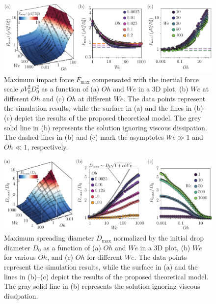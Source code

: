\documentclass[preprint,amssymb,superscriptaddress,aps,prl,floatfix]{revtex4-1}
\begin{document}
\begin{figure}
\centering
\includegraphics[width=\linewidth]{Figure2_v4-eps-converted-to.pdf}
\caption{Maximum impact force $F_{\text{max}}$ compensated with the inertial force scale $\rho V_0^2D_0^2$ as a function of (a) $Oh$ and $We$ in a 3D plot, (b) $We$ at different $Oh$ and (c) $Oh$ at different $We$.  The data points represent the simulation results, while the surface in (a) and the lines in (b)--(c) depict the results of the proposed theoretical model. The grey solid line in (b) represents the solution ignoring viscous dissipation. The dashed lines in (b) and (c) mark the asymptotes $We \gg 1$ and $Oh \ll 1$, respectively.}
\label{fig:2}
\end{figure}


\begin{figure}
	\centering
	\includegraphics[width=\linewidth]{Figure3_v6-eps-converted-to.pdf}
	\caption{
 Maximum spreading diameter $D_{\text{max}}$ normalized by the initial drop diameter $D_0$ as a function of (a) $Oh$ and $We$ in a 3D plot, (b) $We$ for various $Oh$, and (c) $Oh$ for different $We$. The data points represent the simulation results, while the surface in (a) and the lines in (b)--(c) depict the results of the proposed theoretical model. The gray solid line in (b) represents the solution ignoring viscous dissipation.}
	\label{fig:3}
\end{figure}
\end{document}
